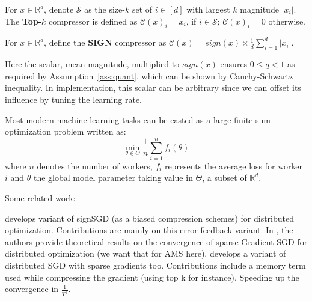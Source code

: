 \documentclass[11pt]{article}
\begin{document}
\begin{definition}[Top-$k$]\label{def:topk}
For $x\in\mathbb R^d$, denote $\mathcal S$ as the size-$k$ set of $i\in[d]$ with largest $k$ magnitude $|x_i|$. The \textbf{Top-$k$} compressor is defined as $\mathcal C(x)_i=x_i$, if $i\in\mathcal S$; $\mathcal C(x)_i=0$ otherwise.
\end{definition}

\begin{definition}[SIGN]\label{def:sign}
For $x\in\mathbb R^d$, define the \textbf{SIGN} compressor as $\mathcal C(x)=sign(x)\times \frac{1}{d}\sum_{i=1}^d |x_i|$. 
\end{definition}
\begin{Remark}
Here the scalar, mean magnitude, multiplied to $sign(x)$ ensures $0\leq q<1$ as required by Assumption~\ref{ass:quant}, which can be shown by Cauchy-Schwartz inequality. In implementation, this scalar can be arbitrary since we can offset its influence by tuning the learning rate. 
\end{Remark}

Most modern machine learning tasks can be casted as a large finite-sum optimization problem written as:
\begin{equation}\label{eq:opt}
\min \limits_{\theta \in \Theta} \frac{1}{n} \sum_{i=1}^n f_i(\theta)
\end{equation}
where $n$ denotes the number of workers, $f_i$ represents the average loss for worker $i$ and $\theta$ the global model parameter taking value in $\Theta$, a subset of $\mathbb{R}^d$.



Some related work:


\citep{karimireddy2019error} develops variant of signSGD (as a biased compression schemes) for distributed optimization. Contributions are mainly on this error feedback variant.
In \citep{shi2019convergence}, the authors provide theoretical results on the convergence of sparse Gradient SGD for distributed optimization (we want that for AMS here).
\citep{stich2018sparsified} develops a variant of distributed SGD with sparse gradients too. Contributions include a memory term used while compressing the gradient (using top k for instance). Speeding up the convergence in $\frac{1}{T^3}$.
\end{document}
